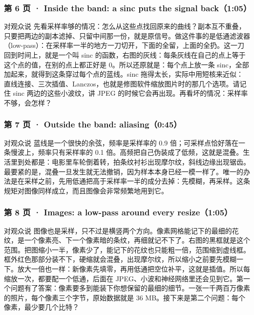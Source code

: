 \subsubsection*{第 6 页 · Inside the band: a sinc puts the signal back（1:05）}
\begin{exampleblock}{对观众说}
先看采样率够的情况：怎么从这些点找回原来的曲线？副本互不重叠，只要把两边的副本滤掉、只留中间那一份，就是原信号。做这件事的是低通滤波器（low-pass）：在采样率一半的地方一刀切开，下面的全留，上面的全扔。这一刀回到时间上，就是一个叫 sinc 的函数，右图的灰线：每条灰线在自己的点上等于这个点的值，在别的点上都正好是 0。所以还原就是：每个点上放一条 sinc，全部加起来，就得到这条穿过每个点的蓝线。sinc 拖得太长，实际中用短核来近似：直线连接、三次插值、Lanczos，也就是修图软件缩放图片时的那几个选项。请记住 sinc 两边的这些小波纹，讲 JPEG 的时候它会再出现。再看坏的情况：采样率不够，会怎样？
\end{exampleblock}

\subsubsection*{第 7 页 · Outside the band: aliasing（0:45）}
\begin{exampleblock}{对观众说}
蓝线是一个很快的余弦，频率是采样率的 0.9 倍；可采样点恰好落在一条慢波上，频率只有采样率的 0.1 倍。高频把自己伪装成了低频，这就是混叠。生活里到处都是：电影里车轮倒着转，拍条纹衬衫出现摩尔纹，斜线边缘出现锯齿。最要紧的是，混叠一旦发生就无法撤销，因为样本本身已经一模一样了。唯一的办法是在采样之前，先用低通把高于采样率一半的成分去掉：先模糊，再采样。这条规矩对图像同样成立，而且图像会非常频繁地用到它。
\end{exampleblock}

\subsubsection*{第 8 页 · Images: a low-pass around every resize（1:05）}
\begin{exampleblock}{对观众说}
图像也是采样，只不过是横竖两个方向。像素网格能记下的最细的花纹，是一个像素亮、下一个像素暗的条纹，再细就记不下了。右图的黑框就是这个范围。把图缩小一半，像素少了，能记下的花纹也只能粗一倍，范围缩到虚线框。框外红色那部分装不下，硬缩就会混叠，出现摩尔纹，所以缩小之前要先模糊一下。放大一倍也一样：新像素先填零，再用低通把空位补平，这就是插值。所以每缩放一次，都要配一个低通，后面在 JPEG、小波和神经网络里还会见到它。第一个问题有了答案：像素要多到能装下你想保留的最细的细节。一张一千两百万像素的照片，每个像素三个字节，原始数据就是 36 MB。接下来是第二个问题：每个像素，最少要几个比特？
\end{exampleblock}

